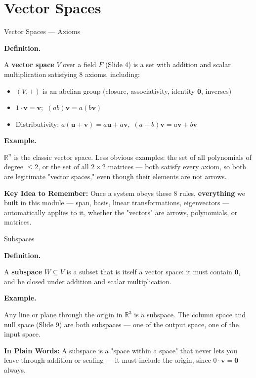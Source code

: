\documentclass[9pt,aspectratio=169]{beamer}
\newcommand{\keyidea}[1]{%
\par\medskip\noindent\textbf{Key Idea to Remember:} #1\par\medskip}
\newcommand{\childex}[1]{%
\par\medskip\noindent\textbf{In Plain Words:} #1\par\medskip}
\begin{document}
\section{Vector Spaces}

\begin{frame}{Vector Spaces --- Axioms}
\par\noindent\textbf{Definition.}\par
A \textbf{vector space} $V$ over a field $F$ (Slide 4) is a set with addition and scalar
multiplication satisfying 8 axioms, including:
\begin{itemize}
\item $(V,+)$ is an abelian group (closure, associativity, identity $\mathbf{0}$, inverses)
\item $1\cdot\mathbf{v}=\mathbf{v}$; $\ (ab)\mathbf{v}=a(b\mathbf{v})$
\item Distributivity: $a(\mathbf{u}+\mathbf{v})=a\mathbf{u}+a\mathbf{v}$,\
$(a+b)\mathbf{v}=a\mathbf{v}+b\mathbf{v}$
\end{itemize}
\medskip


\par\noindent\textbf{Example.}\par
$\mathbb{R}^n$ is the classic vector space. Less obvious examples: the set of all
polynomials of degree $\le 2$, or the set of all $2\times2$ matrices --- both satisfy every
axiom, so both are legitimate "vector spaces," even though their elements are not arrows.
\medskip


\keyidea{Once a system obeys these 8 rules, \textbf{everything} we built in this
module --- span, basis, linear transformations, eigenvectors --- automatically applies to
it, whether the "vectors" are arrows, polynomials, or matrices.}
\end{frame}

\begin{frame}{Subspaces}
\par\noindent\textbf{Definition.}\par
A \textbf{subspace} $W\subseteq V$ is a subset that is itself a vector space: it must
contain $\mathbf{0}$, and be closed under addition and scalar multiplication.
\medskip


\par\noindent\textbf{Example.}\par
Any line or plane through the origin in $\mathbb{R}^3$ is a subspace. The column space and
null space (Slide 9) are both subspaces --- one of the output space, one of the input
space.
\medskip


\childex{A subspace is a "space within a space" that never lets you leave through addition
or scaling --- it must include the origin, since $0\cdot\mathbf{v}=\mathbf{0}$ always.}
\end{frame}
\end{document}

